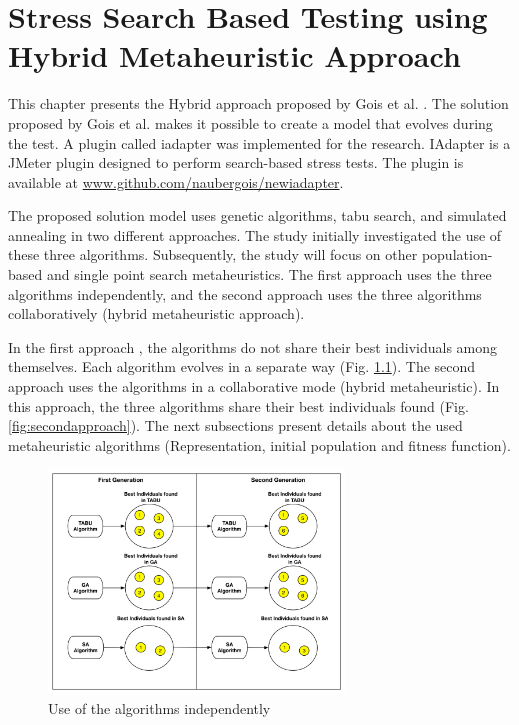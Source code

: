 \documentclass{report}
\begin{document}
\chapter{Stress Search Based Testing using Hybrid Metaheuristic Approach}

This chapter presents the Hybrid approach proposed by Gois et al. \cite{Gois2016}. The solution proposed by Gois et al. makes it possible to create a model that evolves during the test. A plugin called iadapter was implemented for the research. IAdapter is a JMeter plugin designed to perform search-based stress tests.  The plugin is available at \url{www.github.com/naubergois/newiadapter}.


The proposed solution model uses genetic algorithms, tabu search, and simulated annealing in two different approaches. The study initially investigated the use of these three algorithms. Subsequently, the study will focus on other population-based and single point search metaheuristics. The first approach uses the three algorithms independently, and the second approach uses the three algorithms collaboratively (hybrid metaheuristic approach).

In the first approach , the algorithms do not share their best individuals among themselves. Each algorithm evolves in a separate way (Fig. \ref{fig:firstaproach}). The second approach uses the algorithms in a collaborative mode (hybrid metaheuristic). In this approach, the three algorithms share their best individuals found (Fig. \ref{fig:secondapproach}). The next subsections present details about the used metaheuristic algorithms (Representation, initial population and fitness function).

\begin{figure}[h]
\centering
\includegraphics[width=0.7\textwidth]{./images/independ.png}
\caption{Use of the algorithms independently \cite{Gois2016}}
\label{fig:firstaproach}
\end{figure}
\end{document}
